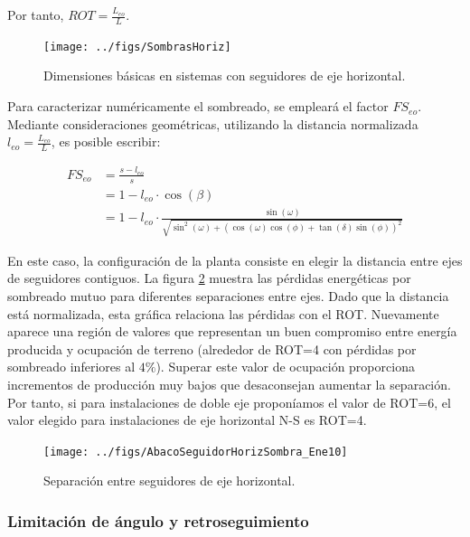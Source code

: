 Por tanto, $ROT=\frac{L_{eo}}{L}$.

\begin{figure}
  \centering
  \texttt{[image: ../figs/SombrasHoriz]}
  \caption{Dimensiones básicas en sistemas con seguidores de eje horizontal.}
  \label{fig:SeguidorEjeHorizontalSombras}
\end{figure}

Para caracterizar numéricamente el sombreado, se empleará el factor
$FS_{eo}$. Mediante consideraciones geométricas, utilizando la
distancia normalizada $l_{eo}=\frac{L_{eo}}{L}$, es posible escribir:

\begin{align}
FS_{eo} & =\frac{s-l_{eo}}{s}\nonumber \\
 & =1-l_{eo}\cdot\cos(\beta)\nonumber \\
 &
 =1-l_{eo}\cdot\frac{\sin(\omega)}{\sqrt{\sin^{2}(\omega)+\left(\cos(\omega)\cos(\phi)+\tan(\delta)\sin(\phi)\right)^{2}}}\label{eq:FSeoHorizontal}
\end{align}

En este caso, la  configuración
de la planta consiste en elegir la distancia entre ejes de seguidores
contiguos. La figura \ref{fig:SeguidoresEjeHorizontalSeparacion}
muestra las pérdidas energéticas por sombreado mutuo para diferentes
separaciones entre ejes. Dado que la distancia está normalizada, esta gráfica relaciona las pérdidas con el ROT.
Nuevamente aparece una región de valores que representan un buen compromiso
entre energía producida y ocupación de terreno (alrededor de ROT=4
con pérdidas por sombreado inferiores al $4\%$). Superar este valor
de ocupación proporciona incrementos de producción muy bajos que desaconsejan
aumentar la separación. Por tanto, si para instalaciones de doble eje proponíamos el valor
de ROT=6, el valor elegido para instalaciones de eje horizontal N-S
es ROT=4.

\begin{figure}
  \centering
  \texttt{[image: ../figs/AbacoSeguidorHorizSombra\_Ene10]}

  \caption{Separación entre seguidores de eje horizontal.}
  \label{fig:SeguidoresEjeHorizontalSeparacion}
\end{figure}

\subsubsection{Limitación de ángulo y retroseguimiento}
\label{sec:backtracking}

